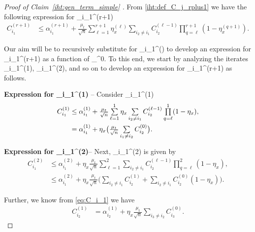 \documentclass{article}
\def\[#1\]{{$#1$}}
\begin{document}
\begin{proof}[Proof of Claim~\ref{iht:gen_term_simple} ]
	From \eqref{iht:def_C_j_rplus1} we have the following expression for \[C_{i_1}^{(r+1)}\]
	\begin{align*}
	C_{i_1}^{(r+1)} 
	&\leq  \alpha^{(r+1)}_{i_1}  + \tfrac{\mu_t}{\sqrt{n}}\textstyle\sum\limits_{\ell=1}^{r+1} \eta_x^{(\ell)}\sum\limits_{i_2 \neq i_1} C_{i_2}^{(\ell-1)}\prod\limits_{q = \ell}^{r+1} (1-\eta_x^{(q+1)}).
	\end{align*}
	
	Our aim will be to recursively substitute for \[C_{i_1}^{()} \] to develop an expression for \[C_{i_1}^{(r+1)}\] as a function of \[C_{\max}^{0}\]. To this end, we start by analyzing the iterates \[C_{i_1}^{(1)}\], \[C_{i_1}^{(2)}\], and so on to develop an expression for \[C_{i_1}^{(r+1)}\] as follows. 
	
	\noindent\textbf{Expression for \[C_{i_1}^{(1)}\]} -- Consider \[C_{i_1}^{(1)}\]
	\begin{align}\label{eq:C_i_1}
	C_{i_1}^{(1)} 
	&\leq \textstyle \alpha^{(1)}_{i_1}  + \tfrac{\mu_t}{\sqrt{n}}\sum\limits_{\ell=1}^{1} \eta_x\sum\limits_{i_2 \neq i_1} C_{i_2}^{(\ell-1)}\prod\limits_{q = \ell}^{1} (1-\eta_x),\notag \\
	&=  \textstyle\alpha^{(1)}_{i_1}  +  \eta_x\big(\tfrac{\mu_t}{\sqrt{n}}\sum\limits_{i_1 \neq i_2} C_{i_2}^{(0)}\big).
	\end{align}
	
	
	\noindent\textbf{Expression for \[C_{i_1}^{(2)}\]}-- Next, \[C_{i_1}^{(2)}\] is given by
	\begin{align*}
	C_{i_1}^{(2)} 
	&\leq  \alpha^{(2)}_{i_1}  + \eta_x\tfrac{\mu_t}{\sqrt{n}}\textstyle\sum\limits_{\ell=1}^{2}\sum\limits_{i_2 \neq i_1} C_{i_2}^{(\ell-1)} \prod\limits_{q = \ell}^{2} (1-\eta_x),\\
	&\leq\textstyle \alpha^{(2)}_{i_1}  + \eta_x\tfrac{\mu_t}{\sqrt{n}}\big(\sum\limits_{i_2 \neq i_1} C_{i_2}^{(1)} + \sum\limits_{i_2 \neq i_1} C_{i_2}^{(0)}(1-\eta_x)  \big).
	\end{align*}
	
	Further, we know from \eqref{eq:C_i_1} we have
	\begin{align*}
	C_{i_2}^{(1)} 
	
	&=  \alpha^{(1)}_{i_2}  +  \eta_x\tfrac{\mu_t}{\sqrt{n}}\textstyle\sum\limits_{i_3 \neq i_2} C_{i_3}^{(0)}.
	\end{align*}
	

\end{proof}
\end{document}
